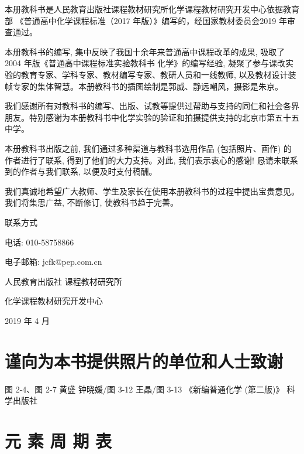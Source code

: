 \documentclass[10pt]{article}
\begin{document}
本册教科书是人民教育出版社课程教材研究所化学课程教材研究开发中心依据教育部 《普通高中化学课程标准（2017 年版）》编写的，经国家教材委员会2019 年审查通过。

本册教科书的编写, 集中反映了我国十余年来普通高中课程改革的成果, 吸取了 2004 年版《普通高中课程标准实验教科书 化学》的编写经验, 凝聚了参与课改实验的教育专家、学科专家、教材编写专家、教研人员和一线教师, 以及教材设计装帧专家的集体智慧。本册教科书的插图绘制是郭威、静远嘲风，摄影是朱京。

我们感谢所有对教科书的编写、出版、试教等提供过帮助与支持的同仁和社会各界朋友。特别感谢为本册教科书中化学实验的验证和拍摄提供支持的北京市第五十五中学。

本册教科书出版之前, 我们通过多种渠道与教科书选用作品 (包括照片、画作) 的作者进行了联系, 得到了他们的大力支持。对此, 我们表示衷心的感谢! 恳请未联系到的作者与我们联系, 以便及时支付稿酬。

我们真诚地希望广大教师、学生及家长在使用本册教科书的过程中提出宝贵意见。我们将集思广益, 不断修订, 使教科书趋于完善。

联系方式

电话: 010-58758866

电子邮箱: jcfk@pep.com.cn

人民教育出版社 课程教材研究所

化学课程教材研究开发中心

2019 年 4 月

\section*{谨向为本书提供照片的单位和人士致谢}

图 2-4、图 2-7 黄盛 钟晓媛/图 3-12 王晶/图 3-13 《新编普通化学 (第二版)》 科学出版社

\section*{元 素 周 期 表}
\end{document}
